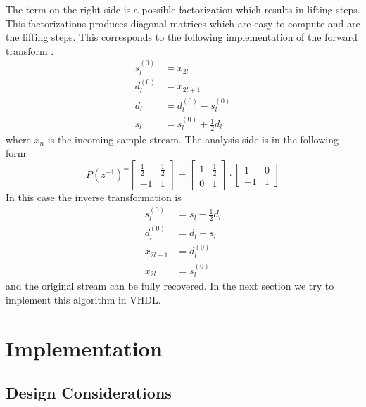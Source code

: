 \begin{refsection}
The term on the right side is a possible factorization which results in lifting steps.
This factorizations produces diagonal matrices which are easy to compute and are the lifting steps.
This corresponds to the following implementation of the forward transform \cite{fpga:Daubechies1998}.
\begin{equation}
	\begin{aligned}
	s_l^{(0)} &= x_{2l} \\
	d_l^{(0)} &= x_{2l+1} \\ 
	d_l &= d_l^{(0)} - s_l^{(0)} \\
	s_l &= s_l^{(0)} + \frac{1}{2}d_l
	\end{aligned}
\end{equation}
where $x_{n}$ is the incoming sample stream.
The analysis side is in the following form:
\begin{equation*}
P(z^{-1})^ =
\begin{bmatrix}
\frac{1}{2} & \frac{1}{2} \\
-1 & 1
\end{bmatrix}
= 
\begin{bmatrix}
1 & \frac{1}{2} \\
0 & 1
\end{bmatrix}
\cdot
\begin{bmatrix}
1 & 0 \\
-1 & 1
\end{bmatrix}
\end{equation*}
In this case the inverse transformation is 
\begin{equation}
\begin{aligned}
s_l^{(0)} &= s_l - \frac{1}{2}d_l \\
d_l^{(0)} &= d_l + s_l \\ 
x_{2l+1}& =d_l^{(0)} \\
x_{2l} &= s_l^{(0)}
\end{aligned}
\end{equation}
and the original stream can be fully recovered.
In the next section we try to implement this algorithm in VHDL.

\section{Implementation}

\subsection{Design Considerations}


\end{refsection}
